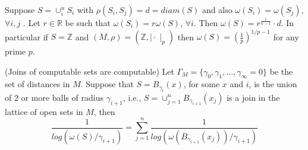 \begin{corollary}
	Suppose $S = \cup_i^n S_i$ with $\rho(S_i, S_j)=d=diam(S)$ and also $\omega(S_i)=\omega(S_j)$, $\forall i,j$ .  Let $r \in \mathbb{R}$ be such that $\omega(S_i)=r\omega(S)$, $\forall i$. Then $\omega(S) = r^{\frac{1}{n-1}}\cdot d$. In particular if $S = \mathbb{Z}$ and $(M,\rho)= (\mathbb{Z}, \mid \cdot\mid_p)$ then $\omega(S)=(\frac{1}{p})^{1/p-1}$ for any prime $p$. 
\end{corollary}

\begin{corollary}
	(Joins of computable sets are computable) Let  $\Gamma_M = \{\gamma_0, \gamma_1,\ldots, \gamma_\infty=0\}$ be the set of distances in $M$. Suppose that $S = B_{\gamma_i}(x)$,  for some $x$ and $i$, is the union of $2$ or more balls of radius $\gamma_{i+1}$, i.e., $S=\cup_{j=1}^n B_{\gamma_{i+1}} (x_j)$ is a join in the lattice of open sets in $M$, then 
	\[\frac{1}{log(\omega(S)/\gamma_{i+1} )} = \sum_{j=1}^n \frac{1}{log(\omega(B_{\gamma_{i+1}}(x_j))/\gamma_{i+1} )}\]
\end{corollary}

